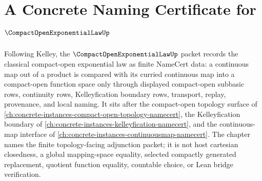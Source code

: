 \chapter{A Concrete Naming Certificate for $\CompactOpenExponentialLawUp$}
\label{ch:concrete-instances-compact-open-exponential-law-namecert}

Following Kelley, the $\CompactOpenExponentialLawUp$ packet records the classical compact-open exponential law as finite NameCert data: a continuous map out of a product is compared with its curried continuous map into a compact-open function space only through displayed compact-open subbasic rows, continuity rows, Kelleyfication boundary rows, transport, replay, provenance, and local naming. It sits after the compact-open topology surface of \autoref{ch:concrete-instances-compact-open-topology-namecert}, the Kelleyfication boundary of \autoref{ch:concrete-instances-kelleyfication-namecert}, and the continuous-map interface of \autoref{ch:concrete-instances-continuousmap-namecert}. The chapter names the finite topology-facing adjunction packet; it is not host cartesian closedness, a global mapping-space equality, selected compactly generated replacement, quotient function equality, countable choice, or Lean bridge verification.

